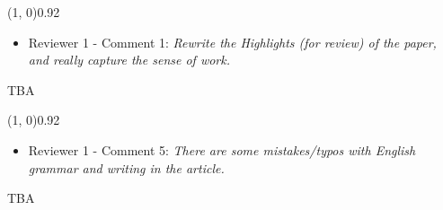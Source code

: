 \documentclass{article}
\begin{document}
    \line(1, 0){0.92\textwidth}
    \begin{itemize}
        \item Reviewer 1 - Comment 1: \textit{Rewrite the Highlights (for
        review) of the paper, and really capture the sense of work.}
    \end{itemize}
    TBA %

    \line(1, 0){0.92\textwidth}
    \begin{itemize}
        \item Reviewer 1 - Comment 5: \textit{There are some mistakes/typos
        with English grammar and writing in the article.}
    \end{itemize}
    TBA %
\end{document}
